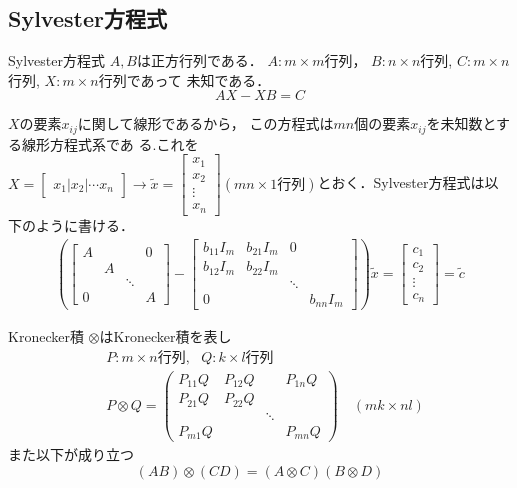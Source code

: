 \subsection{Sylvester方程式}
\begin{itembox}[l]{Sylvester方程式}
$A, B$は正方行列である．
$A:m\times m$行列，
$B:n\times n$行列,
$C:m\times n$行列,
$ X:m\times n$行列であって
未知である．
\begin{equation}
    AX - XB = C
\end{equation}
\end{itembox}
$X$の要素$x_{ij}$に関して線形であるから，
この方程式は$mn$個の要素$x_{ij}$を未知数とする線形方程式系であ
る.これを
$X=\begin{bmatrix}x_1 |x_2 |\cdots x_n\end{bmatrix} \to \tilde{x}=
\begin{bmatrix}
  x_1\\
  x_2\\
  \vdots\\
  x_n
\end{bmatrix}(mn\times 1行列)$とおく．Sylvester方程式は以下のように書ける．
\begin{align}
  \left(
  \begin{bmatrix}
    A&&&0\\
    &A&&\\
    &&\ddots&\\
    0&&&A
  \end{bmatrix}-
  \begin{bmatrix}
    b_{11}I_m&b_{21} I_m&0\\
    b_{12} I_m &b_{22} I_m &&\\
    &&\ddots&\\
    0&&&b_{nn} I_m
  \end{bmatrix}\right) \tilde{x}=
  \begin{bmatrix}
    c_1\\
    c_2\\
    \vdots\\
    c_n
  \end{bmatrix}=\tilde{c}
\end{align}
\begin{itembox}[l]{Kronecker積}
$\otimes$はKronecker積を表し
\begin{align}
  &P:m\times n行列,\ \ \ Q:k\times l行列\\
  &P\otimes Q=
  \begin{pmatrix}
    P_{11}Q&P_{12}Q&&P_{1n}Q\\
    P_{21}Q&P_{22}Q&&\\
    &&\ddots&\\
    P_{m1}Q&&&P_{mn}Q
  \end{pmatrix}
  \quad (mk \times nl)
\end{align}
また以下が成り立つ
\begin{equation}
    (AB)\otimes(CD) =
    (A \otimes C) (B \otimes D)
\end{equation}
\end{itembox}
